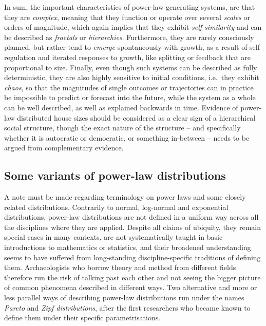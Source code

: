 \documentclass[
  12pt,
  a4paper, twoside]{book}
\begin{document}
In sum, the important characteristics of power-law generating systems, are that they are \emph{complex}, meaning that they function or operate over several \emph{scales} or orders of magnitude, which again implies that they exhibit \emph{self-similarity} and can be described as \emph{fractals} or \emph{hierarchies}. Furthermore, they are rarely consciously planned, but rather tend to \emph{emerge} spontaneously with growth, as a result of self-regulation and iterated responses to growth, like splitting or feedback that are proportional to size. Finally, even though such systems can be described as fully deterministic, they are also highly sensitive to initial conditions, i.e.~they exhibit \emph{chaos}, so that the magnitudes of single outcomes or trajectories can in practice be impossible to predict or forecast into the future, while the system as a whole can be well described, as well as explained backwards in time. Evidence of power-law distributed house sizes should be considered as a clear sign of a hierarchical social structure, though the exact nature of the structure -- and specifically whether it is autocratic or democratic, or something in-between -- needs to be argued from complementary evidence.

\hypertarget{some-variants-of-power-law-distributions}{%
\subsection{Some variants of power-law distributions}\label{some-variants-of-power-law-distributions}}

A note must be made regarding terminology on power laws and some closely related distributions. Contrarily to normal, log-normal and exponential distributions, power-law distributions are not defined in a uniform way across all the disciplines where they are applied. Despite all claims of ubiquity, they remain special cases in many contexts, are not systematically taught in basic introductions to mathematics or statistics, and their broadened understanding seems to have suffered from long-standing discipline-specific traditions of defining them. Archaeologists who borrow theory and method from different fields therefore run the risk of talking past each other and not seeing the bigger picture of common phenomena described in different ways. Two alternative and more or less parallel ways of describing power-law distributions run under the names \emph{Pareto} and \emph{Zipf distributions}, after the first researchers who became known to define them under their specific parametrisations.
\end{document}
